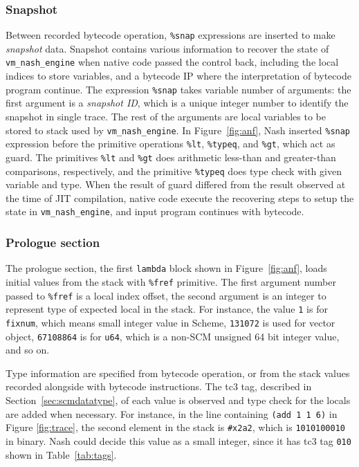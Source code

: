 \documentclass[preprint, 10pt]{sigplanconf}
\begin{document}
\subsubsection{Snapshot}

Between recorded bytecode operation, \texttt{\%snap} expressions are inserted to
make \textit{snapshot} data. Snapshot contains various information to recover
the state of \texttt{vm\_nash\_engine} when native code passed the control back,
including the local indices to store variables, and a bytecode IP where the
interpretation of bytecode program continue. The expression \texttt{\%snap}
takes variable number of arguments: the first argument is a \textit{snapshot
  ID}, which is a unique integer number to identify the snapshot in single
trace. The rest of the arguments are local variables to be stored to stack used
by \texttt{vm\_nash\_engine}. In Figure~\hyperref[fig:anf]{\ref{fig:anf}}, Nash
inserted \texttt{\%snap} expression before the primitive operations
\texttt{\%lt}, \texttt{\%typeq}, and \texttt{\%gt}, which act as guard. The
primitives \texttt{\%lt} and \texttt{\%gt} does arithmetic less-than and
greater-than comparisons, respectively, and the primitive \texttt{\%typeq} does
type check with given variable and type. When the result of guard differed from
the result observed at the time of JIT compilation, native code execute the
recovering steps to setup the state in \texttt{vm\_nash\_engine}, and input
program continues with bytecode.


\subsubsection{Prologue section}

The prologue section, the first \texttt{lambda} block shown in
Figure~\hyperref[fig:anf]{\ref{fig:anf}}, loads initial values from the stack
with \texttt{\%fref} primitive. The first argument number passed to
\texttt{\%fref} is a local index offset, the second argument is an integer to
represent type of expected local in the stack. For instance, the value
\texttt{1} is for \texttt{fixnum}, which means small integer value in Scheme,
\texttt{131072} is used for vector object, \texttt{67108864} is for
\texttt{u64}, which is a non-SCM unsigned 64 bit integer value, and so on.

Type information are specified from bytecode operation, or from the stack values
recorded alongside with bytecode instructions. The tc3 tag, described in
Section~\ref{sec:scmdatatype}, of each value is observed and type check for the
locals are added when necessary. For instance, in the line containing
\texttt{(add~1~1~6)} in Figure \hyperref[fig:trace]{\ref{fig:trace}}, the second
element in the stack is \texttt{\#x2a2}, which is \texttt{1010100010} in
binary. Nash could decide this value as a small integer, since it has tc3 tag
\texttt{010} shown in Table~\hyperref[tab:tags]{\ref{tab:tags}}.
\end{document}
